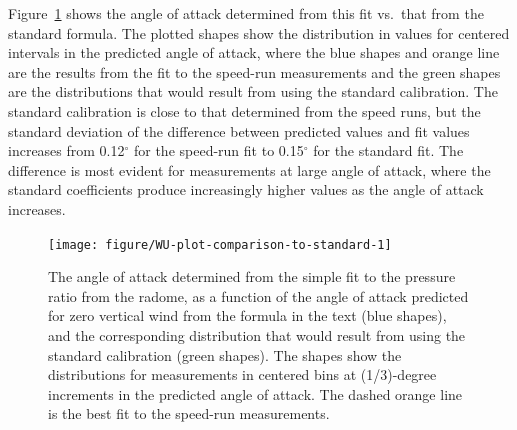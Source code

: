 \documentclass[12pt,twoside,english]{article}\usepackage[]{graphicx}\usepackage[]{color}
\newenvironment{knitrout}{}{} %
\let\OrgIndex\index
\renewcommand*{\index}[1]{\OrgIndex{#1}}
\begin{document}
Figure~\ref{fig:plot-comparison-to-standard} shows the angle of attack determined from this fit vs.\ that from the standard formula. The plotted shapes show the distribution in values for centered intervals in the predicted angle of attack, where the blue shapes and orange line are the results from the fit to the speed-run measurements and the green shapes are the distributions that would result from using the standard calibration. The standard calibration is close to that determined from the speed runs, but the standard deviation of the difference between predicted values and fit values increases from 0.12$^{\circ}$ for the speed-run fit to 0.15$^{\circ}$ for the standard fit. The difference is most evident for measurements at large angle of attack, where the standard coefficients produce increasingly higher values as the angle of attack increases. 

\begin{knitrout}\footnotesize
{}\color{fgcolor}\begin{figure}

{\centering \texttt{[image: figure/WU-plot-comparison-to-standard-1]} 

}

\caption[Angle of attack determined from the simple fit to the pressure ratio from the radome.]{The angle of attack determined from the simple fit to the pressure ratio from the radome, as a function of the angle of attack predicted for zero vertical wind from the formula in the text (blue shapes), and the corresponding distribution that would result from using the standard calibration (green shapes). The shapes show the distributions for measurements in centered bins at (1/3)-degree increments in the predicted angle of attack. The dashed orange line is the best fit to the speed-run measurements.}\label{fig:plot-comparison-to-standard}
\end{figure}


\end{knitrout}
\end{document}
